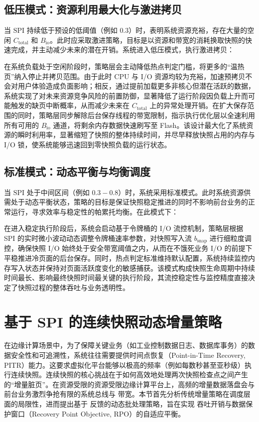 \subsection{低压模式：资源利用最大化与激进拷贝}

当 $\text{SPI}$ 持续低于预设的低阈值（例如 $0.3$）时，表明系统资源充裕，存在大量的空闲 $C_{\text{total}}$ 和 $B_{\text{io}}$。此时应采取激进策略，目标是以资源和带宽的消耗换取快照的快速完成，并主动减少未来的潜在开销。系统进入低压模式，执行激进拷贝：

在系统负载处于空闲阶段时，策略层会主动降低热点判定门槛，将更多的“温热页”纳入停止并拷贝范围。由于此时 CPU 与 I/O 资源均较为充裕，加速预拷贝不会对用户体验造成负面影响；相反，通过提前加载更多非核心但潜在活跃的数据，系统实现了对未来资源竞争风险的前置防御，显著降低了运行阶段因负载上升而可能触发的缺页中断概率，从而减少未来在 \(C_{\text{total}}\) 上的异常处理开销。在扩大保存范围的同时，策略层同步解除后台保存线程的带宽限制，指示执行优化层以全速利用所有可用的 \(B_{\text{io}}\) 通道，将剩余内存数据快速刷写至 Flash。该设计最大化了系统资源的瞬时利用率，显著缩短了快照的整体持续时间，并尽早释放快照占用的内存与 I/O 锁，使系统能够迅速回到零快照负载的运行状态。


\subsection{标准模式：动态平衡与均衡调度}

当 $\text{SPI}$ 处于中间区间（例如 $0.3-0.8$）时，系统采用标准模式。此时系统资源供需处于动态平衡状态，策略的目标是保证快照稳定推进的同时不影响前台业务的正常运行，寻求效率与稳定性的帕累托均衡。在此模式下：

在进入稳定执行阶段后，系统会启动基于令牌桶的 I/O 流控机制，策略层根据 SPI 的实时微小波动动态调整令牌桶速率参数，对快照写入流 \(b_{\text{snap}}\) 进行细粒度调控，确保快照 I/O 始终处于安全带宽阈值之内，从而在不饿死业务 I/O 的前提下平稳推进冷页面的后台保存。同时，热点判定标准维持默认配置，系统持续监控内存写入状态并保持对页面活跃度变化的敏感捕获。该模式构成快照生命周期中持续时间最长、影响最终快照时间最关键的执行阶段，其流控稳定性与监控精度直接决定了快照过程的整体吞吐与业务透明性。


\section{基于 SPI 的连续快照动态增量策略}
\label{sec:cont}
在边缘计算场景中，为了保障关键业务（如工业控制数据日志、数据库事务）的数据安全性和可追溯性，系统往往需要提供时间点恢复（Point-in-Time Recovery, PITR）能力\cite{ta2008virtual}。这要求虚拟化平台能够以极高的频率（例如每数秒甚至亚秒级）执行连续快照。连续快照的核心挑战在于如何高效地处理两次快照检查点之间产生的“增量脏页”\cite{shi2022memory, li2014consnap}。在资源受限的资源受限边缘计算平台上，高频的增量数据落盘会与前台业务激烈争抢有限的系统总线与  带宽。本节首先分析传统增量策略在调度层面的局限性，进而提出基于  反馈的动态批处理策略，旨在实现  吞吐开销与数据保护窗口（Recovery Point Objective, RPO）的自适应平衡\cite{edge_virtualization_review, tosic2023criu_edge}。

